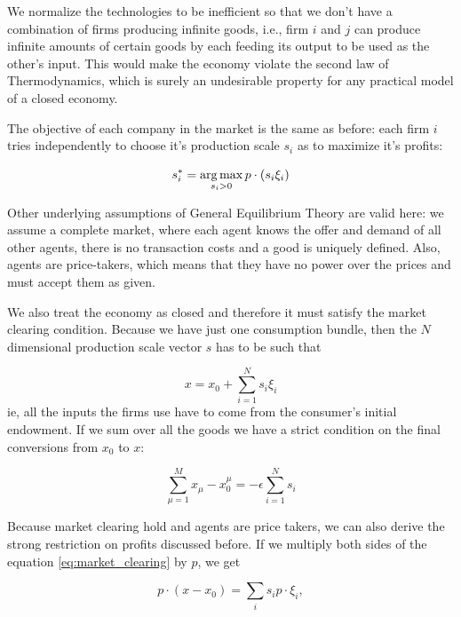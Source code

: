We normalize the technologies to be inefficient so that we don't have
a combination of firms producing infinite goods, i.e., firm $i$
and $j$ can produce infinite amounts of certain goods by each feeding
its output to be used as the other's input. This would make the economy violate the second law of Thermodynamics, which is surely an undesirable property for any practical model of a closed economy.

The objective of each company in the market is the same as before:
each firm $i$ tries independently to choose it's production scale
$s_i$ as to maximize it's profits:

\begin{equation}
  \label{eq:rle_6}
  s_i^\ast = \operatorname*{arg\,max}_{s_i > 0} p\cdot (s_i \xi_i)
\end{equation}

Other underlying assumptions of General Equilibrium Theory are valid
here: we assume a complete market, where each agent knows the offer
and demand of all other agents, there is no transaction costs and a
good is uniquely defined. Also, agents are price-takers, which means
that they have no power over the prices and must accept them as given.

We also treat the economy as closed and therefore it must satisfy the market
clearing condition. Because we have just one consumption bundle, then
the $N$ dimensional production scale vector $s$ has to be such that

\begin{equation}
x = x_0 + \sum_{i=1}^N s_i \xi_i
\label{eq:market_clearing}
\end{equation}
ie, all the inputs the firms use have to come from the consumer's
initial endowment. If we sum over all the goods we have a strict condition on the final conversions from $x_0$ to $x$:

\begin{equation}
\label{eq:mc_eff}
  \sum_{\mu = 1}^M x_\mu - x_0^\mu = -\epsilon \sum_{i=1}^N s_i
\end{equation}

Because market clearing hold and agents are price takers, we can also
derive the strong restriction on profits discussed before. If we
multiply both sides of the equation \eqref{eq:market_clearing} by $p$,
we get

\begin{equation}
  \label{eq:market_clearing_p}
  p\cdot (x - x_0) = \sum_i s_i p \cdot \xi_i,
\end{equation}

